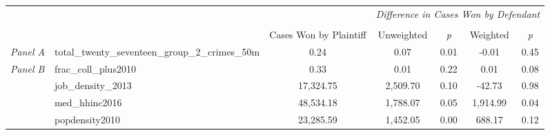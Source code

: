 \begin{tabular}{llccccc}
\toprule
 &  & \textit{} & \multicolumn{4}{c}{\textit{Difference in Cases Won by Defendant}} \\
\cline{4-7}
\\
 &  & Cases Won by Plaintiff & Unweighted & \emph{p} & Weighted & \emph{p} \\
\midrule
\textit{Panel A} & total_twenty_seventeen_group_2_crimes_50m & 0.24 & 0.07 & 0.01 & -0.01 & 0.45 \\
\cline{1-7}
\multirow[c]{4}{3cm}{\textit{Panel B}} & frac_coll_plus2010 & 0.33 & 0.01 & 0.22 & 0.01 & 0.08 \\
 & job_density_2013 & 17,324.75 & 2,509.70 & 0.10 & -42.73 & 0.98 \\
 & med_hhinc2016 & 48,534.18 & 1,788.07 & 0.05 & 1,914.99 & 0.04 \\
 & popdensity2010 & 23,285.59 & 1,452.05 & 0.00 & 688.17 & 0.12 \\
\cline{1-7}
\bottomrule
\end{tabular}
